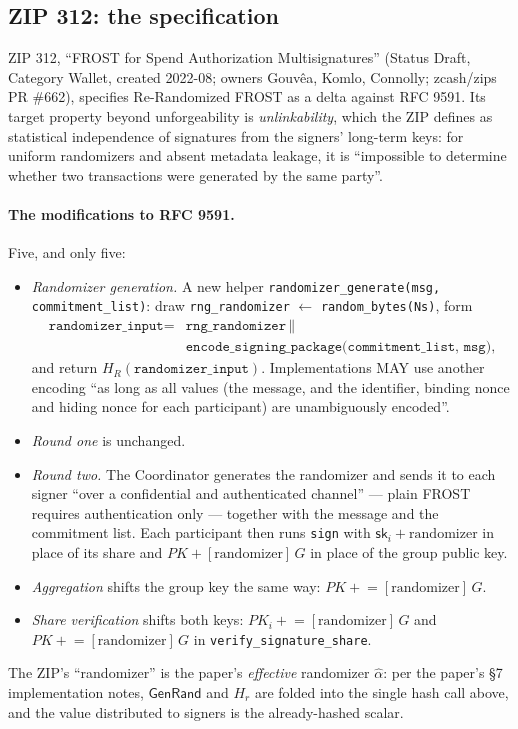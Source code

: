 \documentclass[11pt,a4paper]{article}
\theoremstyle{definition}
\begin{document}
\subsection{ZIP 312: the specification}\label{sec:fr-rerand-zip}

ZIP 312, ``FROST for Spend Authorization Multisignatures'' (Status
Draft, Category Wallet, created 2022-08; owners Gouv\^ea, Komlo,
Connolly; zcash/zips PR \#662), specifies Re-Randomized FROST as a
delta against RFC 9591. Its target property beyond unforgeability is
\emph{unlinkability}, which the ZIP defines as statistical independence
of signatures from the signers' long-term keys: for uniform randomizers
and absent metadata leakage, it is ``impossible to determine whether two
transactions were generated by the same party''.

\paragraph{The modifications to RFC 9591.} Five, and only five:
\begin{itemize}
\item \emph{Randomizer generation.} A new helper
  \texttt{randomizer\_generate(msg, commitment\_list)}: draw
  \texttt{rng\_randomizer} $\gets$ \texttt{random\_bytes(Ns)}, form
  \begin{align*}
  \texttt{randomizer\_input} = {} & \texttt{rng\_randomizer} \,\|\, \\
  & \texttt{encode\_signing\_package(commitment\_list, msg)},
  \end{align*}
  and return $H_R(\texttt{randomizer\_input})$. Implementations MAY use
  another encoding ``as long as all values (the message, and the
  identifier, binding nonce and hiding nonce for each participant) are
  unambiguously encoded''.
\item \emph{Round one} is unchanged.
\item \emph{Round two.} The Coordinator generates the randomizer and
  sends it to each signer ``over a confidential and authenticated
  channel'' --- plain FROST requires authentication only --- together
  with the message and the commitment list. Each participant then runs
  \texttt{sign} with $\mathsf{sk}_i + \mathrm{randomizer}$ in place of
  its share and $PK + [\mathrm{randomizer}]\,G$ in place of the group
  public key.
\item \emph{Aggregation} shifts the group key the same way:
  $PK \mathrel{+}= [\mathrm{randomizer}]\,G$.
\item \emph{Share verification} shifts both keys:
  $PK_i \mathrel{+}= [\mathrm{randomizer}]\,G$ and
  $PK \mathrel{+}= [\mathrm{randomizer}]\,G$ in
  \texttt{verify\_signature\_share}.
\end{itemize}
The ZIP's ``randomizer'' is the paper's \emph{effective} randomizer
$\hat{\alpha}$: per the paper's \S7 implementation notes,
$\mathsf{GenRand}$ and $H_r$ are folded into the single hash call above,
and the value distributed to signers is the already-hashed scalar.
\end{document}

